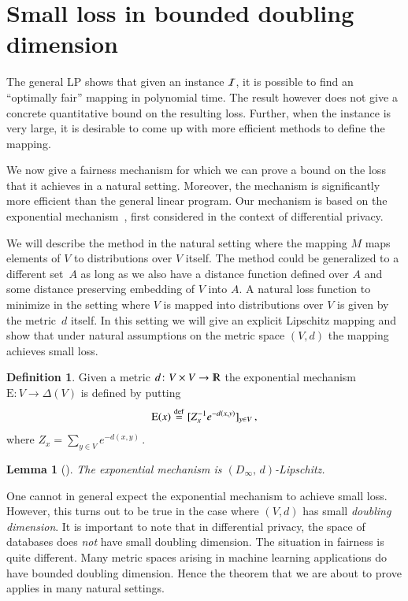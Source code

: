 \documentclass[letterpaper,11pt]{article}
\newtheorem{lemma}[theorem]{Lemma}%
\theoremstyle{definition}
\newtheorem{definition}{Definition}[section]
\renewcommand{\mathbb}{\varmathbb}
\newcommand{\mper}{\,.}
\newcommand{\mcom}{\,,}
\newcommand{\R}{\mathbb{R}}
\newcommand{\cI}{{\cal I}}
\newcommand{\defeq}{\stackrel{\small \mathrm{def}}{=}}
\newcommand\ExM{\mathrm{E}}
\newcommand\dtoDinfty{D_\infty,\, d}
\begin{document}

\section{Small loss in bounded doubling dimension}
\label{sec:expmechanism}

The general LP shows that given an instance $\cI$, it is possible to find an
``optimally fair'' mapping in polynomial time. The result however does not
give a concrete quantitative bound on the resulting loss.  Further, when the
instance is very large, it is desirable to come up with more efficient methods
to define the mapping.

We now give a fairness mechanism for which we can prove a bound on the loss
that it achieves in a natural setting. Moreover, the mechanism is
significantly more efficient than the general linear program.
Our mechanism is based on the exponential mechanism~\cite{McSherryTa07}, first
considered in the context of differential privacy.

We will describe the method in the natural setting where the mapping $M$ maps
elements of $V$ to distributions over $V$ itself. The method could be
generalized to a different set~$A$ as long as we also have a distance function
defined over $A$ and some distance preserving embedding of $V$ into $A$.  A
natural loss function to minimize in the setting where $V$ is mapped into
distributions over $V$ is given by the metric~$d$ itself. In this setting we
will give an explicit Lipschitz mapping and show that under natural
assumptions on the metric space $(V,d)$ the mapping achieves small loss.

\begin{definition}
Given a metric $d\colon V\times V\to\R$ the exponential mechanism
$\ExM\colon V\to\Delta(V)$ is defined by putting
\[
\ExM(x)\defeq [Z_x^{-1}e^{-d(x,y)}]_{y\in V}\mcom
\]
where $Z_x=\sum_{y\in V}e^{-d(x,y)}\mper$
\end{definition}

\begin{lemma}[\cite{McSherryTa07}]
The exponential mechanism is $(\dtoDinfty)$-Lipschitz.
\end{lemma}

One cannot in general expect the exponential mechanism to achieve small loss.
However, this turns out to be true in the case where $(V,d)$ has small
\emph{doubling dimension}. It is important to note that in differential
privacy, the space of databases does \emph{not} have small doubling dimension.
The situation in fairness is quite different. Many metric spaces arising in
machine learning applications do have bounded doubling dimension. Hence the
theorem that we are about to prove applies in many natural settings.
\end{document}
